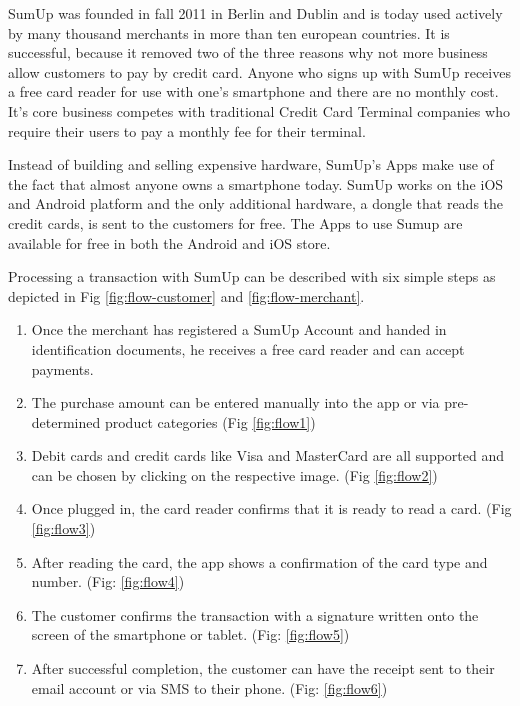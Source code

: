 \documentclass[a4paper, oneside]{csthesis}
\begin{document}
SumUp was founded in fall 2011 in Berlin and Dublin and is today used actively by many thousand merchants in more than ten european countries. It is successful, because it removed two of the three reasons why not more business allow customers to pay by credit card. Anyone who signs up with SumUp receives a free card reader for use with one's smartphone and there are no monthly cost. It's core business competes with traditional Credit Card Terminal companies who require their users to pay a monthly fee for their terminal.

Instead of building and selling expensive hardware, SumUp's Apps make use of the fact that almost anyone owns a smartphone today. SumUp works on the iOS and Android platform and the only additional hardware, a dongle that reads the credit cards, is sent to the customers for free. The Apps to use Sumup are available for free in both the Android and iOS store.



Processing a transaction with SumUp can be described with six simple steps as depicted in Fig \ref{fig:flow-customer} and \ref{fig:flow-merchant}.

\begin{enumerate}
    \item Once the merchant has registered a SumUp Account and handed in identification documents, he receives a free card reader and can accept payments.
    \item The purchase amount can be entered manually into the app or via pre-determined product categories (Fig \ref{fig:flow1})
    \item Debit cards and credit cards like Visa and MasterCard are all supported and can be chosen by clicking on the respective image. (Fig \ref{fig:flow2})
    \item Once plugged in, the card reader confirms that it is ready to read a card. (Fig \ref{fig:flow3})
    \item After reading the card, the app shows a confirmation of the card type and number. (Fig: \ref{fig:flow4})
    \item The customer confirms the transaction with a signature written onto the screen of the smartphone or tablet. (Fig: \ref{fig:flow5})
    \item After successful completion, the customer can have the receipt sent to their email account or via SMS to their phone. (Fig: \ref{fig:flow6})
\end{enumerate}
\end{document}
